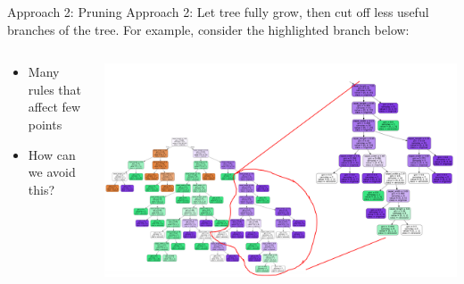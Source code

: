 \documentclass[aspectratio=169]{../latex_main/tntbeamer}  %
\begin{document}
	
	\begin{frame}{Approach 2: Pruning}
	    Approach 2: Let tree fully grow, then cut off less useful branches of the tree. For example, consider the highlighted branch below:
	    
	    \begin{columns}
	        
	        \begin{column}{0.3\textwidth}
	    
	        \begin{itemize}
	            \item Many rules that affect few points
	            \item How can we avoid this?
	        \end{itemize}
	                
	        \end{column}
	        
	        \begin{column}{0.7\textwidth}
	        
	            \centering
	        \vspace{-2.3em}
	        \includegraphics[scale=.33]{Bild53}
	                
	        \end{column}
	        
	    \end{columns}
	    
	        
	\end{frame}
	
\end{document}
